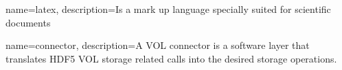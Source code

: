 \makeglossaries

{
        name=latex,
        description={Is a mark up language specially suited for 
scientific documents}
}
  
{
        name=connector,
        description={A VOL connector is a software layer that translates
HDF5 VOL storage related calls into the desired storage operations.}
}



